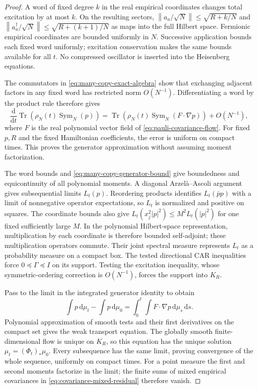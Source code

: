 \documentclass[11pt,a4paper,oneside]{book}
\theoremstyle{plain}
\theoremstyle{definition}
\theoremstyle{remark}
\newcommand{\dd}{\mathrm d}
\newcommand{\Tr}{\operatorname{Tr}}
\newcommand{\norm}[1]{\left\lVert#1\right\rVert}
\newcommand{\src}[2]{\cite{#1}}
\begin{document}
\begin{proof}
A word of fixed degree $k$ in the real empirical coordinates changes
total excitation by at most $k$.  On the resulting sectors,
$\norm{a_a/\sqrt N}\le\sqrt{R+k/N}$ and
$\norm{a_a^\dagger/\sqrt N}\le\sqrt{R+(k+1)/N}$ as maps into the full
Hilbert space.  Fermionic empirical coordinates are bounded uniformly
in $N$.  Successive application bounds each fixed word uniformly;
excitation conservation makes the same bounds available for all $t$.
No compressed oscillator is inserted into the Heisenberg equations.

The commutators in \eqref{eq:many-copy-exact-algebra} show that exchanging
adjacent factors in any fixed word has restricted norm $O(N^{-1})$.
Differentiating a word by the product rule therefore gives
\begin{equation}
 \frac{\dd}{\dd t}\Tr(\rho_N(t)\operatorname{Sym}_N(p))
 =\Tr(\rho_N(t)\operatorname{Sym}_N(F\cdot\nabla p))+O(N^{-1}),
 \label{eq:many-copy-generator-bound}
\end{equation}
where $F$ is the real polynomial vector field of
\eqref{eq:pauli-covariance-flow}.  For fixed $p,R$ and the fixed
Hamiltonian coefficients, the error is uniform on compact times.
This proves the generator approximation without assuming moment
factorization.

The word bounds and \eqref{eq:many-copy-generator-bound} give boundedness
and equicontinuity of all polynomial moments.  A diagonal
Arzel\`a--Ascoli argument gives subsequential limits $L_t(p)$.
Reordering products identifies
$L_t(\bar p p)$ with a limit of nonnegative operator expectations, so
$L_t$ is normalized and positive on squares.  The coordinate bounds
also give $L_t(x_j^2|p|^2)\le M^2L_t(|p|^2)$ for one fixed sufficiently
large $M$.  In the polynomial Hilbert-space representation, multiplication
by each coordinate is therefore bounded self-adjoint; these multiplication
operators commute.  Their joint spectral measure represents $L_t$ as
a probability measure on a compact box.  The tested directional CAR
inequalities force $0\preceq\Gamma\preceq I$ on its support.  Testing
the excitation inequality, whose symmetric-ordering correction is
$O(N^{-1})$, forces the support into $K_R$.

Pass to the limit in the integrated generator identity to obtain
\[
 \int p\,\dd\mu_t-\int p\,\dd\mu_0
   =\int_0^t\int F\cdot\nabla p\,\dd\mu_s\,\dd s.
\]
Polynomial approximation of smooth tests and their first derivatives
on the compact set gives the weak transport equation.  The globally
smooth finite-dimensional flow is unique on $K_R$, so this equation
has the unique solution $\mu_t=(\Phi_t)_*\mu_0$.  Every subsequence has
the same limit, proving convergence of the whole sequence, uniformly
on compact times.  For a point measure the first and second moments
factorize in the limit; the finite sums of mixed empirical covariances
in \eqref{eq:covariance-mixed-residual} therefore vanish.
\end{proof}
\src{R20}{thm:v20v72-transport}
\end{document}
